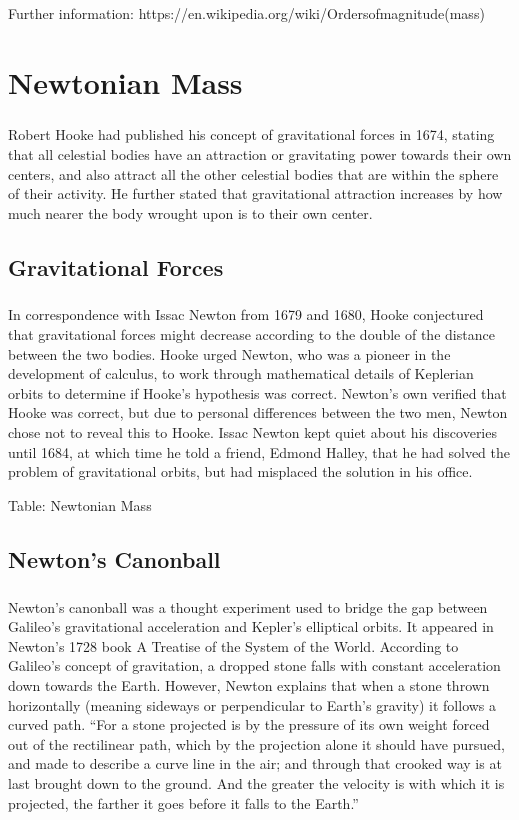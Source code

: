 \documentclass{book}
\begin{document}
	Further information: https://en.wikipedia.org/wiki/Ordersofmagnitude(mass)
	
	\chapter{Newtonian Mass}
	\paragraph{}
	Robert Hooke had published his concept of gravitational forces in 1674, stating that all celestial bodies have an attraction or gravitating power towards their own centers, and also attract all the other celestial bodies that are within the sphere of their activity. He further stated that gravitational attraction increases by how much nearer the body wrought upon is to their own center.
	
	\section{Gravitational Forces}
	\paragraph{}
	In correspondence with Issac Newton from 1679 and 1680, Hooke conjectured that gravitational forces might decrease according to the double of the distance between the two bodies. Hooke urged Newton, who was a pioneer in the development of calculus, to work through mathematical details of Keplerian orbits to determine if Hooke's hypothesis was correct. Newton's own verified that Hooke was correct, but due to personal differences between the two men, Newton chose not to reveal this to Hooke. Issac Newton kept quiet about his discoveries until 1684, at which time he told a friend, Edmond Halley, that he had solved the problem of gravitational orbits, but had misplaced the solution in his office.
	
	Table: Newtonian Mass
	
	\section{Newton's Canonball}
	\paragraph{}
	Newton's canonball was a thought experiment used to bridge the gap between Galileo's gravitational acceleration and Kepler's elliptical orbits. It appeared in Newton's 1728 book A Treatise of the System of the World. According to Galileo's concept of gravitation, a dropped stone falls with constant acceleration down towards the Earth. However, Newton explains that when a stone thrown horizontally (meaning sideways or perpendicular to Earth's gravity) it follows a curved path. ``For a stone projected is by the pressure of its own weight forced out of the rectilinear path, which by the projection alone it should have pursued, and made to describe a curve line in the air; and through that crooked way is at last brought down to the ground. And the greater the velocity is with which it is projected, the farther it goes before it falls to the Earth.''
	
\end{document}
